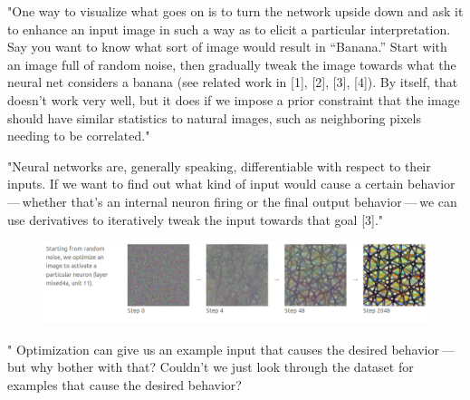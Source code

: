 \documentclass[]{scrartcl}
\begin{document}
"One way to visualize what goes on is to turn the network upside down and ask it to enhance an input image in such a way as to elicit a particular interpretation. Say you want to know what sort of image would result in “Banana.” Start with an image full of random noise, then gradually tweak the image towards what the neural net considers a banana (see related work in [1], [2], [3], [4]). By itself, that doesn’t work very well, but it does if we impose a prior constraint that the image should have similar statistics to natural images, such as neighboring pixels needing to be correlated." \cite{Mordvintsev2015}

"Neural networks are, generally speaking, differentiable with respect to their inputs. If we want to find out what kind of input would cause a certain behavior --- whether that's an internal neuron firing or the final output behavior --- we can use derivatives to iteratively tweak the input towards that goal [3]." \cite{Olah2017}
\begin{figure}[h]
	\centering
	\includegraphics[width=1\linewidth]{randopt}
\end{figure}

" Optimization can give us an example input that causes the desired behavior --- but why bother with that? Couldn't we just look through the dataset for examples that cause the desired behavior?
\end{document}

